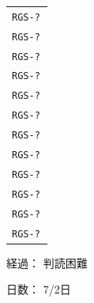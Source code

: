 \documentclass[UTF8,10pt,a4paper,fontset=fandol]{ctexart}
\newcommand{\fieldvalue}[1]{#1}
\newcommand{\handwritten}[1]{#1}
\begin{document}
\begin{minipage}[t]{0.30\linewidth}
\small
\begin{tabular}{p{0.95\linewidth}}
\texttt{RGS-?} \\
\texttt{RGS-?} \\
\texttt{RGS-?} \\
\texttt{RGS-?} \\
\texttt{RGS-?} \\
\texttt{RGS-?} \\
\texttt{RGS-?} \\
\texttt{RGS-?} \\
\texttt{RGS-?} \\
\texttt{RGS-?} \\
\texttt{RGS-?} \\
\texttt{RGS-?} \\
\end{tabular}

\vspace{1em}

経過：%
\fieldvalue{\handwritten{判読困難}}

\vspace{0.5em}

日数：%
\fieldvalue{\handwritten{7/2日}}
\end{minipage}
\hfill
\end{document}
